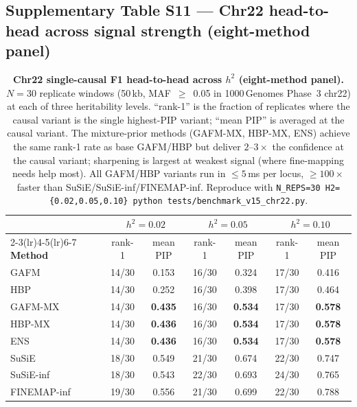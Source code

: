 \clearpage

\subsection*{Supplementary Table S11 --- Chr22 head-to-head across signal strength (eight-method panel)}

\begin{table}[htbp]
\centering\small
\caption{\textbf{Chr22 single-causal F1 head-to-head across $h^2$ (eight-method panel).}
$N{=}30$ replicate windows (50\,kb, MAF~$\geq$~0.05 in 1000\,Genomes
Phase~3 chr22) at each of three heritability levels. ``rank-1'' is the
fraction of replicates where the causal variant is the
single highest-PIP variant; ``mean PIP'' is averaged at the causal
variant. The mixture-prior methods (GAFM-MX, HBP-MX, ENS) achieve
the same rank-1 rate as base GAFM/HBP but deliver
$2$--$3\times$ the confidence at the causal variant; sharpening is
largest at weakest signal (where fine-mapping needs help most). All
GAFM/HBP variants run in $\leq 5$\,ms per locus, $\geq 100\times$
faster than SuSiE/SuSiE-inf/FINEMAP-inf. Reproduce with
\texttt{N\_REPS=30 H2=\{0.02,0.05,0.10\} python tests/benchmark\_v15\_chr22.py}.}
\label{tab:sup_v15_chr22}
\begin{tabular}{l c c c c c c}
\toprule
 & \multicolumn{2}{c}{\textbf{$h^2 = 0.02$}}
 & \multicolumn{2}{c}{\textbf{$h^2 = 0.05$}}
 & \multicolumn{2}{c}{\textbf{$h^2 = 0.10$}} \\
\cmidrule(lr){2-3}\cmidrule(lr){4-5}\cmidrule(lr){6-7}
\textbf{Method} & rank-1 & mean PIP & rank-1 & mean PIP & rank-1 & mean PIP \\
\midrule
GAFM         & 14/30 & 0.153 & 16/30 & 0.324 & 17/30 & 0.416 \\
HBP          & 14/30 & 0.252 & 16/30 & 0.398 & 17/30 & 0.464 \\
GAFM-MX      & 14/30 & \textbf{0.435} & 16/30 & \textbf{0.534} & 17/30 & \textbf{0.578} \\
HBP-MX       & 14/30 & \textbf{0.436} & 16/30 & \textbf{0.534} & 17/30 & \textbf{0.578} \\
ENS          & 14/30 & \textbf{0.436} & 16/30 & \textbf{0.534} & 17/30 & \textbf{0.578} \\
SuSiE        & 18/30 & 0.549 & 21/30 & 0.674 & 22/30 & 0.747 \\
SuSiE-inf    & 18/30 & 0.543 & 22/30 & 0.693 & 24/30 & 0.765 \\
FINEMAP-inf  & 19/30 & 0.556 & 21/30 & 0.699 & 22/30 & 0.788 \\
\bottomrule
\end{tabular}
\end{table}

